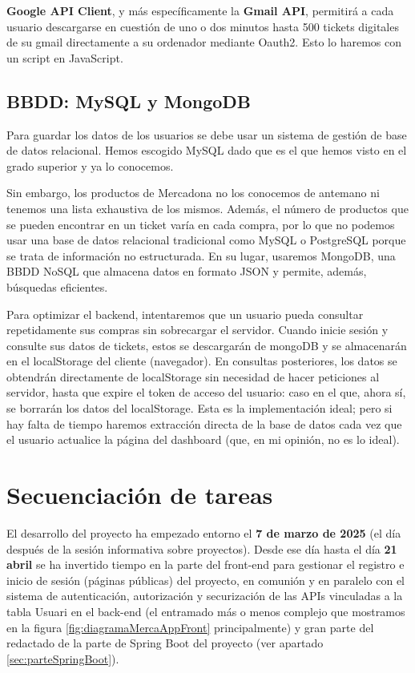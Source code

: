 \documentclass[a4paper,12pt]{report}
\begin{document}
			\textbf{Google API Client}, y más específicamente la \textbf{Gmail API}, permitirá a cada usuario descargarse en cuestión de uno o dos minutos hasta 500 tickets digitales de su gmail directamente a su ordenador mediante Oauth2. Esto lo haremos con un script en JavaScript.
			
		\subsection{BBDD: MySQL y MongoDB}
		
		
		Para guardar los datos de los usuarios se debe usar un sistema de gestión de base de datos relacional. Hemos escogido MySQL dado que es el que hemos visto en el grado superior y ya lo conocemos.
		
		Sin embargo, los productos de Mercadona no los conocemos de antemano ni tenemos una lista exhaustiva de los mismos. Además, el número de productos que se pueden encontrar en un ticket varía en cada compra, por lo que no podemos usar una base de datos relacional tradicional como MySQL o PostgreSQL porque se trata de información no estructurada. En su lugar, usaremos MongoDB, una BBDD NoSQL que almacena datos en formato JSON y permite, además, búsquedas eficientes.
		
		Para optimizar el backend, intentaremos que un usuario pueda consultar repetidamente sus compras sin sobrecargar el servidor. Cuando inicie sesión y consulte sus datos de tickets, estos se descargarán de mongoDB y se almacenarán en el localStorage del cliente (navegador). En consultas posteriores, los datos se obtendrán directamente de localStorage sin necesidad de hacer peticiones al servidor, hasta que expire el token de acceso del usuario: caso en el que, ahora sí, se borrarán los datos del localStorage. Esta es la implementación ideal; pero si hay falta de tiempo haremos extracción directa de la base de datos cada vez que el usuario actualice la página del dashboard (que, en mi opinión, no es lo ideal).
		



		
		\section{Secuenciación de tareas}
		
		El desarrollo del proyecto ha empezado entorno el \textbf{7 de marzo de 2025} (el día después de la sesión informativa sobre proyectos). Desde ese día hasta el día \textbf{21 abril} se ha invertido tiempo en la parte del front-end para gestionar el registro e inicio de sesión (páginas públicas) del proyecto, en comunión y en paralelo con el sistema de autenticación, autorización y securización de las APIs vinculadas a la tabla Usuari en el back-end (el entramado más o menos complejo que mostramos en la figura \ref{fig:diagramaMercaAppFront} principalmente) y gran parte del redactado de la parte de Spring Boot del proyecto (ver apartado \ref{sec:parteSpringBoot}).
		
\end{document}

